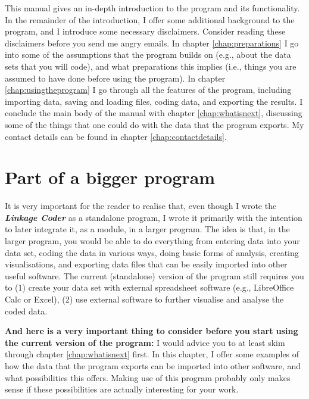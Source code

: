\documentclass{memoir}
\begin{document}
This manual gives an in-depth introduction to the program and its functionality. In the remainder of the introduction, I offer some additional background to the program, and I introduce some necessary disclaimers. Consider reading these disclaimers before you send me angry emails. In chapter \ref{chap:preparations} I go into some of the assumptions that the program builds on (e.g., about the data sets that you will code), and what preparations this implies (i.e., things you are assumed to have done before using the program). In chapter \ref{chap:usingtheprogram} I go through all the features of the program, including importing data, saving and loading files, coding data, and exporting the results. I conclude the main body of the manual with chapter \ref{chap:whatisnext}, discussing some of the things that one could do with the data that the program exports. My contact details can be found in chapter \ref{chap:contactdetails}. 

\section{Part of a bigger program}
\label{sec:partofbiggerprogram}

It is very important for the reader to realise that, even though I wrote the \textbf{\emph{Linkage Coder}} as a standalone program, I wrote it primarily with the intention to later integrate it, as a module, in a larger program. The idea is that, in the larger program, you would be able to do everything from entering data into your data set, coding the data in various ways, doing basic forms of analysis, creating visualisations, and exporting data files that can be easily imported into other useful software. The current (standalone) version of the program still requires you to (1) create your data set with external spreadsheet software (e.g., LibreOffice Calc or Excel), (2) use external software to further visualise and analyse the coded data.

\textbf{And here is a very important thing to consider before you start using the current version of the program:} I would advice you to at least skim through chapter \ref{chap:whatisnext} first. In this chapter, I offer some examples of how the data that the program exports can be imported into other software, and what possibilities this offers. Making use of this program probably only makes sense if these possibilities are actually interesting for your work.
\end{document}
